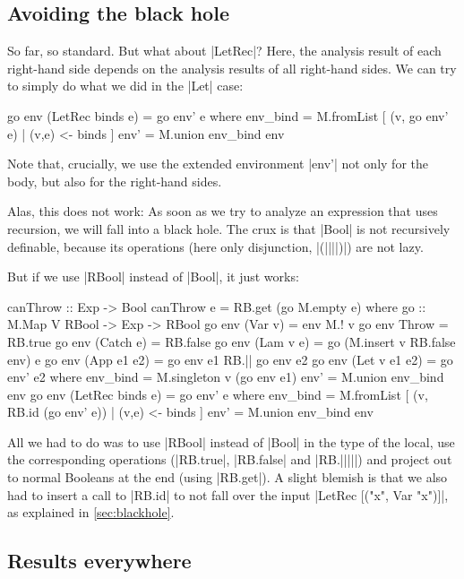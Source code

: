 \documentclass[manuscript,anonymous,screen,acmsmall]{acmart}
\begin{document}
\subsection{Avoiding the black hole}
So far, so standard. But what about |LetRec|? Here, the analysis result of each right-hand side depends on the analysis results of all right-hand sides. We can try to simply do what we did in the |Let| case:
\restorecolumns
\begin{code}
    go env (LetRec binds e) = go env' e
      where
        env_bind  = M.fromList [ (v, go env' e) | (v,e) <- binds ]
        env'      = M.union env_bind env
\end{code}
Note that, crucially, we use the extended environment |env'| not only for the body, but also for the right-hand sides.

Alas, this does not work: As soon as we try to analyze an expression that uses recursion, we will fall into a black hole. The crux is that |Bool| is not recursively definable, because its operations (here only disjunction, |(||||)|) are not lazy.

But if we use |RBool| instead of |Bool|, it just works:
\restorecolumns
\begin{code}
canThrow :: Exp -> Bool
canThrow e = RB.get (go M.empty e)
  where
    go :: M.Map V RBool -> Exp -> RBool
    go env (Var v)          = env M.! v
    go env Throw            = RB.true
    go env (Catch e)        = RB.false
    go env (Lam v e)        = go (M.insert v RB.false env) e
    go env (App e1 e2)      = go env e1 RB.|| go env e2
    go env (Let v e1 e2)    = go env' e2
      where
        env_bind  = M.singleton v (go env e1)
        env'      = M.union env_bind env
    go env (LetRec binds e) = go env' e
      where
        env_bind  = M.fromList [ (v, RB.id (go env' e)) | (v,e) <- binds ]
        env'      = M.union env_bind env
\end{code}
All we had to do was to use |RBool| instead of |Bool| in the type of the local, use the corresponding operations (|RB.true|, |RB.false| and |RB.|||||) and  project out to normal Booleans at the end (using |RB.get|). A slight blemish is that we also had to insert a call to |RB.id| to not fall over the input |LetRec [("x", Var "x")]|, as explained in \cref{sec:blackhole}.

\subsection{Results everywhere}
\end{document}
